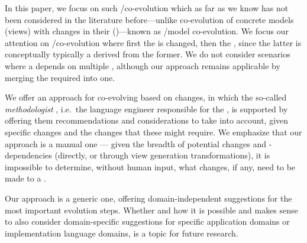In this paper, we focus on such \metamodel/\viewtype co-evolution which as far as we know has not been considered in the literature before---unlike co-evolution of concrete models (views) with changes in their \metamodel (\viewtype)---known as \metamodel/model co-evolution.
We focus our attention on \metamodel/\viewtype co-evolution where first the \metamodel is changed, then the \viewtype, since the latter is conceptually typically a \metamodel derived from the former. %
We do not consider scenarios where a \viewtype depends on multiple \metamodels, although our approach remains applicable by merging the required \metamodels into one. %

We offer an approach for co-evolving \viewtypes based on \metamodel changes, in which the so-called \textit{methodologist} \cite{atkinson_orthographic_2010}, i.e.~the language engineer responsible for the \viewtype, is supported by offering them recommendations and considerations to take into account, given specific \metamodel changes and the \viewtype changes that these might require. We emphasize that our approach is a manual one --- given the breadth of potential \metamodel changes and \viewtypes-\metamodel dependencies (directly, or through view generation transformations), it is impossible to determine, without human input, what changes, if any, need to be made to a \viewtype.

Our approach is a generic one, offering domain-independent suggestions for the most important \metamodel evolution steps. Whether and how it is possible and makes sense to also consider domain-specific suggestions for specific application domains or implementation language domains, is a topic for future research. 

